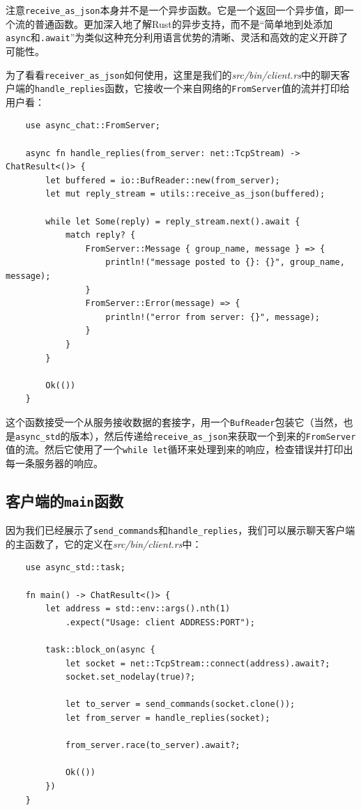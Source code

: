注意\texttt{receive\_as\_json}本身并不是一个异步函数。它是一个返回一个异步值，即一个流的普通函数。更加深入地了解Rust的异步支持，而不是“简单地到处添加\texttt{async}和\texttt{.await}”为类似这种充分利用语言优势的清晰、灵活和高效的定义开辟了可能性。 

为了看看\texttt{receiver\_as\_json}如何使用，这里是我们的\emph{src/bin/client.rs}中的聊天客户端的\texttt{handle\_replies}函数，它接收一个来自网络的\texttt{FromServer}值的流并打印给用户看：
\begin{verbatim}
    use async_chat::FromServer;

    async fn handle_replies(from_server: net::TcpStream) -> ChatResult<()> {
        let buffered = io::BufReader::new(from_server);
        let mut reply_stream = utils::receive_as_json(buffered);

        while let Some(reply) = reply_stream.next().await {
            match reply? {
                FromServer::Message { group_name, message } => {
                    println!("message posted to {}: {}", group_name, message);
                }
                FromServer::Error(message) => {
                    println!("error from server: {}", message);
                }
            }
        }

        Ok(())
    }
\end{verbatim}

这个函数接受一个从服务接收数据的套接字，用一个\texttt{BufReader}包装它（当然，也是\texttt{async\_std}的版本），然后传递给\texttt{receive\_as\_json}来获取一个到来的\texttt{FromServer}值的流。然后它使用了一个\texttt{while let}循环来处理到来的响应，检查错误并打印出每一条服务器的响应。

\subsection{客户端的\texttt{main}函数}
因为我们已经展示了\texttt{send\_commands}和\texttt{handle\_replies}，我们可以展示聊天客户端的主函数了，它的定义在\emph{src/bin/client.rs}中：
\begin{verbatim}
    use async_std::task;

    fn main() -> ChatResult<()> {
        let address = std::env::args().nth(1)
            .expect("Usage: client ADDRESS:PORT");

        task::block_on(async {
            let socket = net::TcpStream::connect(address).await?;
            socket.set_nodelay(true)?;
            
            let to_server = send_commands(socket.clone());
            let from_server = handle_replies(socket);

            from_server.race(to_server).await?;

            Ok(())
        })
    }
\end{verbatim}

